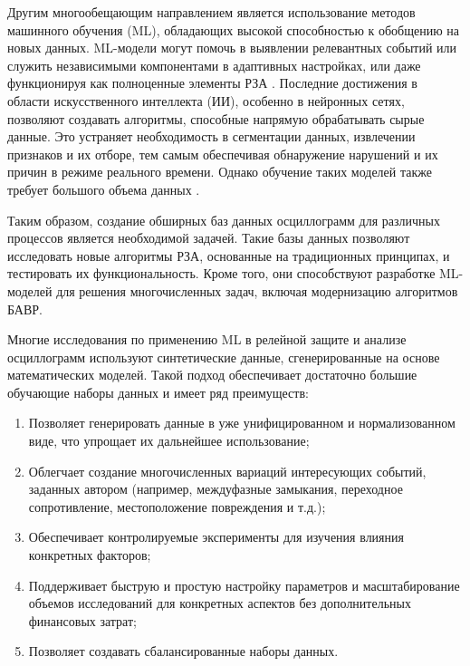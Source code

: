 Другим многообещающим направлением является использование методов машинного обучения
(ML), обладающих высокой способностью к обобщению на новых данных. ML-модели могут
помочь в выявлении релевантных событий или служить независимыми компонентами в
адаптивных настройках, или даже функционируя как полноценные элементы РЗА
\cite{bavr_bib_080_d_2019,bavr_bib_081_x_2024}. Последние достижения в области
искусственного интеллекта (ИИ), особенно в нейронных сетях, позволяют создавать
алгоритмы, способные напрямую обрабатывать сырые данные. Это устраняет необходимость в
сегментации данных, извлечении признаков и их отборе, тем самым обеспечивая обнаружение
нарушений и их причин в режиме реального времени. Однако обучение таких моделей также
требует большого объема данных \cite{bavr_bib_082_a_2024}.\par\vspace{0.2cm}

Таким образом, создание обширных баз данных осциллограмм для различных процессов
является необходимой задачей. Такие базы данных позволяют исследовать новые алгоритмы
РЗА, основанные на традиционных принципах, и тестировать их функциональность. Кроме
того, они способствуют разработке ML-моделей для решения многочисленных задач, включая
модернизацию алгоритмов БАВР.\par\vspace{0.2cm}

Многие исследования по применению ML в релейной защите
\cite{bavr_bib_083_a_2022,bavr_bib_084_a_2023} и анализе осциллограмм используют
синтетические данные, сгенерированные на основе математических моделей. Такой подход
обеспечивает достаточно большие обучающие наборы данных и имеет ряд
преимуществ:\par\vspace{0.2cm}

\begin{enumerate}[label=\arabic*),itemsep=0pt,topsep=2pt]
  \item Позволяет генерировать данные в уже унифицированном и нормализованном виде, что упрощает их дальнейшее использование;
  \item Облегчает создание многочисленных вариаций интересующих событий, заданных автором (например, междуфазные замыкания, переходное сопротивление, местоположение повреждения и т.д.);
  \item Обеспечивает контролируемые эксперименты для изучения влияния конкретных факторов;
  \item Поддерживает быструю и простую настройку параметров и масштабирование объемов исследований для конкретных аспектов без дополнительных финансовых затрат;
  \item Позволяет создавать сбалансированные наборы данных.
\end{enumerate}\par\vspace{0.2cm}

